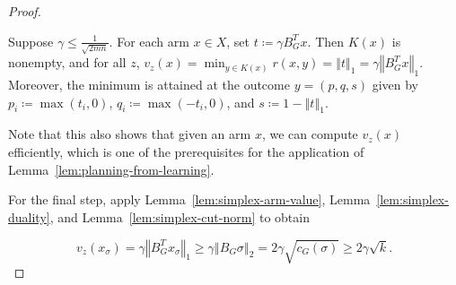 {\begin{proof}
\begin{lemma}\label{lem:simplex-arm-value}

  Suppose $\gamma \le \frac{1}{\sqrt{2 m n}}$. For each arm $x \in X$, set
  $t \coloneqq \gamma B_{G}^{T} x$. Then $K \left( x \right)$ is nonempty, and for all $z$,
  $v_{z} \left( x \right) = \operatorname*{min}_{y \in K \left( x \right)} r \left( x , y \right) = {\left\Vert t \right\Vert}_{1} = \gamma {\left\Vert B_{G}^{T} x \right\Vert}_{1}$. Moreover, the minimum is attained at the outcome $y = \left( p , q , s \right)$ given by
  $p_{i} \coloneqq \operatorname*{max} \left( t_{i} , 0 \right)$, $q_{i} \coloneqq \operatorname*{max} \left( - t_{i} , 0 \right)$, and $s \coloneqq 1 - {\left\Vert t \right\Vert}_{1}$.

\end{lemma}



Note that this also shows that given an arm $x$, we can compute $v_{z} \left( x \right)$ efficiently, which is one of the prerequisites for the application of Lemma~\ref{lem:planning-from-learning}.

For the final step, apply Lemma~\ref{lem:simplex-arm-value}, Lemma~\ref{lem:simplex-duality}, and
Lemma~\ref{lem:simplex-cut-norm} to obtain


\begin{equation*}
v_{z} \left( x_{\sigma} \right) = \gamma {\left\Vert B_{G}^{T} x_{\sigma} \right\Vert}_{1} \ge \gamma {\left\Vert B_{G} \sigma \right\Vert}_{2} = 2 \gamma \sqrt{c_{G} \left( \sigma \right)} \ge 2 \gamma \sqrt{k} .
\end{equation*}



\end{proof}}
